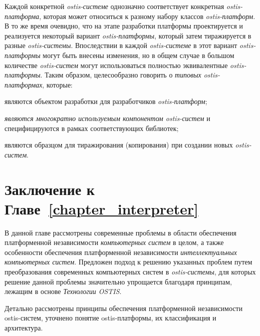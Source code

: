 Каждой конкретной \textit{ostis-системе} однозначно соответствует конкретная \textit{ostis-платформа}, которая может относиться к разному набору классов \textit{ostis-платформ}. В то же время очевидно, что на этапе разработки платформы проектируется и реализуется некоторый вариант \textit{ostis-платформы}, который затем тиражируется в разные \textit{ostis-системы}. Впоследствии в каждой \textit{ostis-системе} в этот вариант \textit{ostis-платформы} могут быть внесены изменения, но в общем случае в большом количестве \textit{ostis-систем} могут использоваться полностью эквивалентные \textit{ostis-платформы}. Таким образом, целесообразно говорить о \textit{типовых ostis-платформах}, которые:
\begin{textitemize}
	\item являются объектом разработки для разработчиков \textit{ostis-платформ};
	\item \textit{являются многократно используемым компонентом ostis-систем} и специфицируются в рамках соответствующих библиотек;
	\item являются образцом для тиражирования (копирования) при создании новых \textit{ostis-систем}.
\end{textitemize}
		
\section*{Заключение к Главе~\ref{chapter_interpreter}}
		
В данной главе рассмотрены современные проблемы в области обеспечения платформенной независимости \textit{компьютерных систем} в целом, а также особенности обеспечения платформенной независимости \textit{интеллектуальных компьютерных систем}. Предложен подход к решению указанных проблем путем преобразования современных компьютерных систем в \textit{ostis-системы}, для которых решение данной проблемы значительно упрощается благодаря принципам, лежащим в основе \textit{Технологии OSTIS}.

Детально рассмотрены принципы обеспечения платформенной независимости ostis-систем, уточнено понятие ostis-платформы, их классификация и архитектура.
		
%